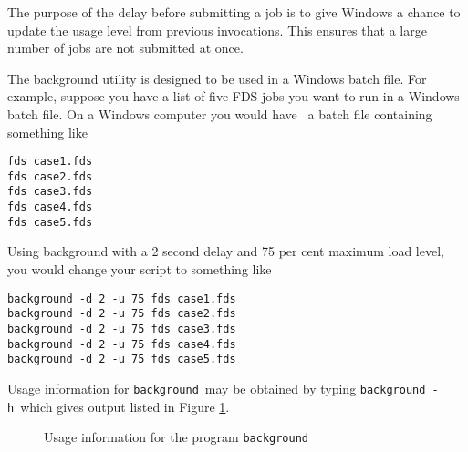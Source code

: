 The purpose of the delay before submitting a job is to give Windows a
chance to update the usage level from 
previous invocations.  This ensures that a
large number of jobs are not
submitted at once.

The background utility is designed to be used in a Windows batch file.
For example, suppose you have
a list of five FDS jobs you want to run in a Windows batch file. On a
Windows computer you would have \
a batch file containing something like

\begin{lstlisting}
fds case1.fds
fds case2.fds
fds case3.fds
fds case4.fds
fds case5.fds
\end{lstlisting}

Using background with a 2 second delay and 75 per cent maximum
load level, you would change your script to something like

\begin{lstlisting}
background -d 2 -u 75 fds case1.fds
background -d 2 -u 75 fds case2.fds
background -d 2 -u 75 fds case3.fds
background -d 2 -u 75 fds case4.fds
background -d 2 -u 75 fds case5.fds
\end{lstlisting}

Usage information for {\tt background}\ may be obtained
by typing {\tt background -h}\ which gives output listed in Figure \ref{fig:background}.

\begin{figure}[bph]
{\small

}
\caption {Usage information for the program {\tt background}}
\label{fig:background}%
\end{figure}
